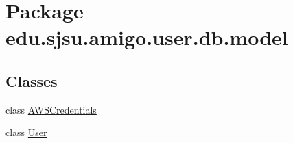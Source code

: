 \hypertarget{namespaceedu_1_1sjsu_1_1amigo_1_1user_1_1db_1_1model}{}\section{Package edu.\+sjsu.\+amigo.\+user.\+db.\+model}
\label{namespaceedu_1_1sjsu_1_1amigo_1_1user_1_1db_1_1model}
\subsection*{Classes}
\begin{DoxyCompactItemize}
\item 
class \hyperlink{classedu_1_1sjsu_1_1amigo_1_1user_1_1db_1_1model_1_1_a_w_s_credentials}{A\+W\+S\+Credentials}
\item 
class \hyperlink{classedu_1_1sjsu_1_1amigo_1_1user_1_1db_1_1model_1_1_user}{User}
\end{DoxyCompactItemize}
